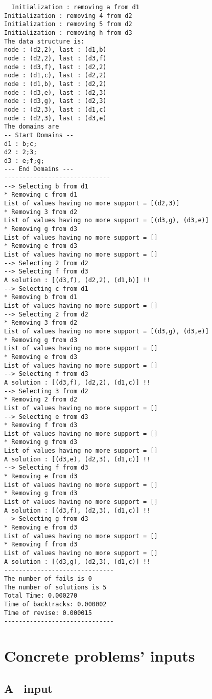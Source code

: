 \documentclass{rapport}
\begin{document}
\begin{verbatim}
  Initialization : removing a from d1  
Initialization : removing 4 from d2
Initialization : removing 5 from d2
Initialization : removing h from d3
The data structure is:
node : (d2,2), last : (d1,b) 
node : (d2,2), last : (d3,f) 
node : (d3,f), last : (d2,2) 
node : (d1,c), last : (d2,2) 
node : (d1,b), last : (d2,2) 
node : (d3,e), last : (d2,3) 
node : (d3,g), last : (d2,3) 
node : (d2,3), last : (d1,c) 
node : (d2,3), last : (d3,e) 
The domains are
-- Start Domains --
d1 : b;c;
d2 : 2;3;
d3 : e;f;g;
--- End Domains ---
-----------------------------
--> Selecting b from d1
* Removing c from d1
List of values having no more support = [(d2,3)]
* Removing 3 from d2
List of values having no more support = [(d3,g), (d3,e)]
* Removing g from d3
List of values having no more support = []
* Removing e from d3
List of values having no more support = []
--> Selecting 2 from d2
--> Selecting f from d3
A solution : [(d3,f), (d2,2), (d1,b)] !!
--> Selecting c from d1
* Removing b from d1
List of values having no more support = []
--> Selecting 2 from d2
* Removing 3 from d2
List of values having no more support = [(d3,g), (d3,e)]
* Removing g from d3
List of values having no more support = []
* Removing e from d3
List of values having no more support = []
--> Selecting f from d3
A solution : [(d3,f), (d2,2), (d1,c)] !!
--> Selecting 3 from d2
* Removing 2 from d2
List of values having no more support = []
--> Selecting e from d3
* Removing f from d3
List of values having no more support = []
* Removing g from d3
List of values having no more support = []
A solution : [(d3,e), (d2,3), (d1,c)] !!
--> Selecting f from d3
* Removing e from d3
List of values having no more support = []
* Removing g from d3
List of values having no more support = []
A solution : [(d3,f), (d2,3), (d1,c)] !!
--> Selecting g from d3
* Removing e from d3
List of values having no more support = []
* Removing f from d3
List of values having no more support = []
A solution : [(d3,g), (d2,3), (d1,c)] !!
------------------------------
The number of fails is 0
The number of solutions is 5
Total Time: 0.000270
Time of backtracks: 0.000002
Time of revise: 0.000015
------------------------------
\end{verbatim}

\section{Concrete problems' inputs}
\subsection{A \allint\ input}
\label{sec:allint_inp}
\end{document}
